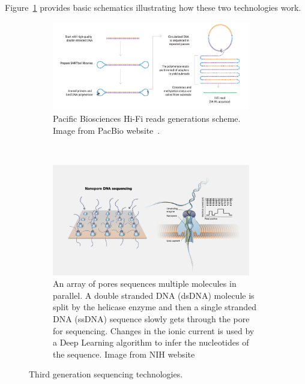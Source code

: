 Figure~\ref{fig:sequencing_technologies} provides basic schematics illustrating how these two technologies work.\\ 
\begin{figure}[!ht]
	\centering
	\begin{subfigure}[b]{0.95\textwidth}
		\centering
		\includegraphics[width=0.95\textwidth]{figures/background/hifi_pacbio.png}
		\caption{Pacific Biosciences Hi-Fi reads generations scheme. Image from PacBio website~\cite{pacbio_hifi}.} 
	\end{subfigure}%
	\\
	\begin{subfigure}[b]{0.95\textwidth}
		\centering
		\includegraphics[width=0.95\textwidth]{figures/background/nanopore_sequencing.jpg}
		\caption{An array of pores sequences multiple molecules in parallel. A double stranded DNA (\gls{dsDNA}) molecule is split by the helicase enzyme and then a single stranded DNA (\gls{ssDNA}) sequence slowly gets through the pore for sequencing. Changes in the ionic current is used by a Deep Learning algorithm to infer the nucleotides of the sequence. Image from NIH website~\cite{nih_nanopore}} 
	\end{subfigure}%
	\caption{Third generation sequencing technologies.}
	\label{fig:sequencing_technologies}
\end{figure}

